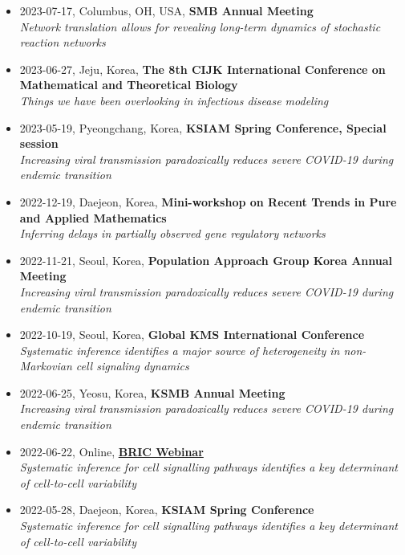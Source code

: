 \documentclass[margin,line]{res}
\begin{document}
\begin{resume}
\begin{itemize}[leftmargin=0pt, label={}]
    \textit{Network translation allows for revealing long-term dynamics of stochastic reaction networks}
    \item 2023-07-17, Columbus, OH, USA, \textbf{SMB Annual Meeting} \\
    \textit{Network translation allows for revealing long-term dynamics of stochastic reaction networks}
    \item 2023-06-27, Jeju, Korea, \textbf{The 8th CIJK International Conference on Mathematical and Theoretical Biology} \\
    \textit{Things we have been overlooking in infectious disease modeling}
    \item 2023-05-19, Pyeongchang, Korea, \textbf{KSIAM Spring Conference, Special session} \\
    \textit{Increasing viral transmission paradoxically reduces severe COVID-19 during endemic transition}
    \item 2022-12-19, Daejeon, Korea, \textbf{Mini-workshop on Recent Trends in Pure and Applied Mathematics} \\
    \textit{Inferring delays in partially observed gene regulatory networks}
    \item 2022-11-21, Seoul, Korea, \textbf{Population Approach Group Korea Annual Meeting} \\
    \textit{Increasing viral transmission paradoxically reduces severe COVID-19 during endemic transition}
    \item 2022-10-19, Seoul, Korea, \textbf{Global KMS International Conference} \\
    \textit{Systematic inference identifies a major source of heterogeneity in non-Markovian cell signaling dynamics}
    \item 2022-06-25, Yeosu, Korea, \textbf{KSMB Annual Meeting} \\
    \textit{Increasing viral transmission paradoxically reduces severe COVID-19 during endemic transition}
    \item 2022-06-22, Online, \href{https://www.ibric.org/bric/webinar/academic-all.do?mode=view&id=394}{\textbf{BRIC Webinar}} \\
    \textit{Systematic inference for cell signalling pathways identifies a key determinant of cell-to-cell variability}
    \item 2022-05-28, Daejeon, Korea, \textbf{KSIAM Spring Conference} \\
    \textit{Systematic inference for cell signalling pathways identifies a key determinant of cell-to-cell variability}

\end{itemize}
\end{resume}
\end{document}
